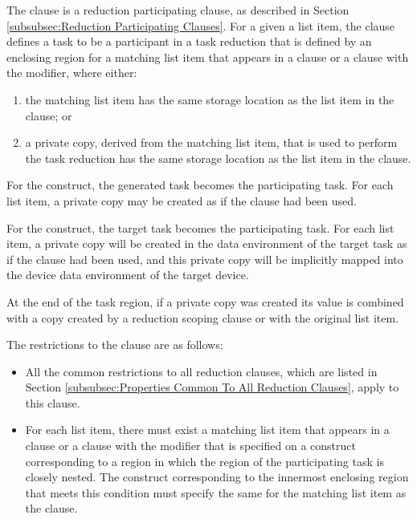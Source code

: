 The  clause is a reduction participating clause, as
described in Section \ref{subsubsec:Reduction Participating Clauses}. For a
given a list item, the  clause defines a task to be a
participant in a task reduction that is defined by an enclosing region for a
matching list item that appears in a  clause or a
 clause with the  modifier, where either:
\begin{enumerate}

\item the matching list item has the same storage location as the list
    item in the  clause; or

\item a private copy, derived from the matching list item, that is used to
    perform the task reduction has the same storage location as the list item
    in the  clause.
\end{enumerate}

For the  construct, the generated task becomes the participating
task. For each list item, a private copy may be created as if the 
clause had been used.

For the  construct, the target task becomes the participating
task. For each list item, a private copy will be created in the data
environment of the target task as if the  clause had been used,
and this private copy will be implicitly mapped into the device data
environment of the target device.

At the end of the task region, if a private copy was created its value is
combined with a copy created by a reduction scoping clause or with the original
list item.

\restrictions
The restrictions to the  clause are as follows:

\begin{itemize}
\item All the common restrictions to all reduction clauses, which are listed in
Section \ref{subsubsec:Properties Common To All Reduction Clauses}, apply to
this clause.

\item For each list item, there must exist a matching list item that appears
    in a  clause or a  clause with the
     modifier that is specified on a construct corresponding to a
    region in which the region of the participating task is closely nested.
    The construct corresponding to the innermost enclosing region that meets
    this condition must specify the same  for the
    matching list item as the  clause.
\end{itemize}



